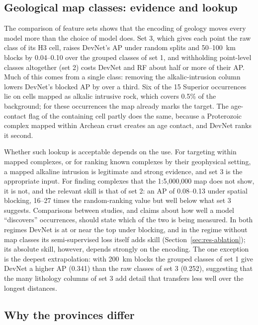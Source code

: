 \documentclass[pdflatex,sn-apa]{sn-jnl}
\begin{document}
\subsection{Geological map classes: evidence and lookup}\label{sec:disc-mapclasses}

The comparison of feature sets shows that the encoding of geology moves every model more than the choice of model does. Set 3, which gives each point the raw class of its H3 cell, raises DevNet's AP under random splits and 50--100~km blocks by 0.04--0.10 over the grouped classes of set 1, and withholding point-level classes altogether (set 2) costs DevNet and RF about half or more of their AP. Much of this comes from a single class: removing the alkalic-intrusion column lowers DevNet's blocked AP by over a third. Six of the 15 Superior occurrences lie on cells mapped as alkalic intrusive rock, which covers 0.5\% of the background; for these occurrences the map already marks the target. The age-contact flag of the containing cell partly does the same, because a Proterozoic complex mapped within Archean crust creates an age contact, and DevNet ranks it second.

Whether such lookup is acceptable depends on the use. For targeting within mapped complexes, or for ranking known complexes by their geophysical setting, a mapped alkaline intrusion is legitimate and strong evidence, and set 3 is the appropriate input. For finding complexes that the 1:5,000,000 map does not show, it is not, and the relevant skill is that of set 2: an AP of 0.08--0.13 under spatial blocking, 16--27 times the random-ranking value but well below what set 3 suggests. Comparisons between studies, and claims about how well a model ``discovers'' occurrences, should state which of the two is being measured. In both regimes DevNet is at or near the top under blocking, and in the regime without map classes its semi-supervised loss itself adds skill (Section~\ref{sec:res-ablation}); its absolute skill, however, depends strongly on the encoding. The one exception is the deepest extrapolation: with 200~km blocks the grouped classes of set 1 give DevNet a higher AP (0.341) than the raw classes of set 3 (0.252), suggesting that the many lithology columns of set 3 add detail that transfers less well over the longest distances.

\subsection{Why the provinces differ}\label{sec:disc-provinces}
\end{document}
